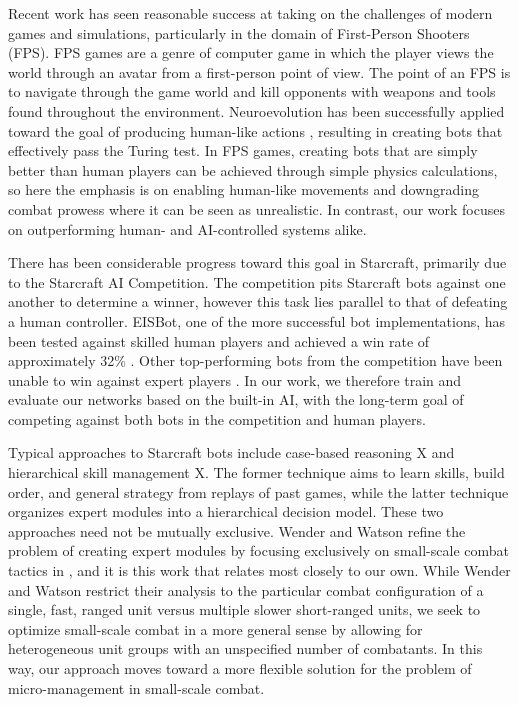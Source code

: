 \documentclass[a4paper]{article}
\newcommand{\fillin}[1]{X}
\begin{document}
Recent work has seen reasonable success at taking on the challenges of modern games and simulations, particularly in the domain of First-Person Shooters (FPS). FPS games are a genre of computer game in which the player views the world through an avatar from a first-person point of view. The point of an FPS is to navigate through the game world and kill opponents with weapons and tools found throughout the environment. Neuroevolution has been successfully applied toward the goal of producing human-like actions \cite{schrum:cig11competition}, resulting in creating bots that effectively pass the Turing test. In FPS games, creating bots that are simply better than human players can be achieved through simple physics calculations, so here the emphasis is on enabling human-like movements and downgrading combat prowess where it can be seen as unrealistic. In contrast, our work focuses on outperforming human- and AI-controlled systems alike.

There has been considerable progress toward this goal in Starcraft, primarily due to the Starcraft AI Competition. The competition pits Starcraft bots against one another to determine a winner, however this task lies parallel to that of defeating a human controller. EISBot, one of the more successful bot implementations, has been tested against skilled human players and achieved a win rate of approximately 32\% \cite{weber2011building}. Other top-performing bots from the competition have been unable to win against expert players \cite{ai_comp_2010_website}. In our work, we therefore train and evaluate our networks based on the built-in AI, with the long-term goal of competing against both bots in the competition and human players.

Typical approaches to Starcraft bots include case-based reasoning \fillin{more citations} and hierarchical skill management \fillin{citations}. The former technique aims to learn skills, build order, and general strategy from replays of past games, while the latter technique organizes expert modules into a hierarchical decision model. These two approaches need not be mutually exclusive. Wender and Watson refine the problem of creating expert modules by focusing exclusively on small-scale combat tactics in \cite{rl_small_scale_combat}, and it is this work that relates most closely to our own. While Wender and Watson restrict their analysis to the particular combat configuration of a single, fast, ranged unit versus multiple slower short-ranged units, we seek to optimize small-scale combat in a more general sense by allowing for heterogeneous unit groups with an unspecified number of combatants. In this way, our approach moves toward a more flexible solution for the problem of micro-management in small-scale combat. 
\end{document}
